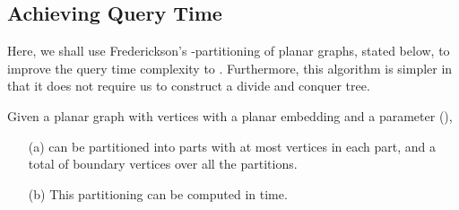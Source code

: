 \documentclass[12pt]{llncs}
\begin{document}
\subsection{Achieving  Query Time}\label{sec:fastquery}
Here, we shall use Frederickson's -partitioning of planar graphs, stated below, 
to improve the query time complexity to . Furthermore, this algorithm is 
simpler in that it does not require us to construct a divide and conquer tree. 


\begin{lemma} \label{fedrick}\cite{fed} Given a planar graph  with  vertices 
with a planar embedding and a parameter  (),
\begin{itemize}
\item[(a)]   can be partitioned into   parts with at most  
vertices in each part, and a total of  boundary vertices over 
all the 
partitions. 
\item[(b)] This partitioning can be computed in  time. 
\end{itemize}
\end{lemma}
\end{document}
